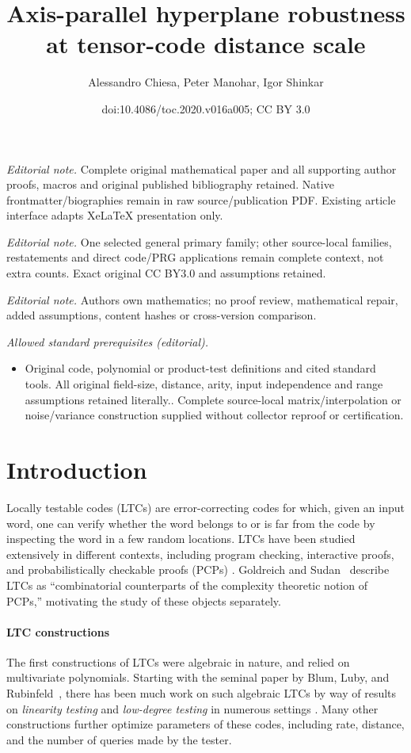 \documentclass[11pt]{article}
\title{Axis-parallel hyperplane robustness at tensor-code distance scale}
\author{Alessandro Chiesa, Peter Manohar, Igor Shinkar}
\date{doi:10.4086/toc.2020.v016a005; CC BY 3.0}
\numberwithin{equation}{section}
\theoremstyle{definition}
\theoremstyle{plain}
\theoremstyle{plain}
\newcommand{\parhead}{\paragraph}
\begin{document}
\maketitle
\noindent\textit{Editorial note.} Complete original mathematical paper and all supporting author proofs, macros and original published bibliography retained. Native frontmatter/biographies remain in raw source/publication PDF. Existing article interface adapts XeLaTeX presentation only.\par\medskip
\noindent\textit{Editorial note.} One selected general primary family; other source-local families, restatements and direct code/PRG applications remain complete context, not extra counts. Exact original CC BY3.0 and assumptions retained.\par\medskip
\noindent\textit{Editorial note.} Authors own mathematics; no proof review, mathematical repair, added assumptions, content hashes or cross-version comparison.\par\medskip
\noindent\textit{Allowed standard prerequisites (editorial).}\begin{itemize}
\item Original code, polynomial or product-test definitions and cited standard tools. All original field-size, distance, arity, input independence and range assumptions retained literally.. Complete source-local matrix/interpolation or noise/variance construction supplied without collector reproof or certification.
\end{itemize}\medskip
\section{Introduction}\label{sec:intro}
%


Locally testable codes (LTCs) are error-correcting codes for which, given an input word, one can verify whether the word belongs to or is far from the code by inspecting the word in a few random locations.
LTCs have been studied extensively in different contexts, including program checking, interactive proofs, and probabilistically checkable proofs (PCPs) \cite{BlumLR93,RubinfeldS96,BabaiFL91,BabaiFLS91,PolishchukS94, GoldreichS06}. Goldreich and Sudan~\cite{GoldreichS06} describe LTCs as ``combinatorial counterparts of the complexity theoretic notion of PCPs,'' motivating the study of these objects separately.

\parhead{LTC constructions}
The first constructions of LTCs were algebraic in nature, and relied on multivariate polynomials. Starting with the seminal
%
paper by  %
Blum, Luby, and Rubinfeld~\cite{BlumLR93}, there has been much work on such algebraic LTCs by way of results on \emph{linearity testing} and \emph{low-degree testing} in numerous settings \cite{BlumLR93,BenOrCLR08,BenSassonSVW03,BellareCHKS96,AlonKKLR05,BhattacharyyaKSSZ10}. Many other constructions \cite{Meir09, Viderman13, KoppartyMRS16} further optimize parameters of these codes,
including rate, distance, and the number of queries made by the tester.
\end{document}

